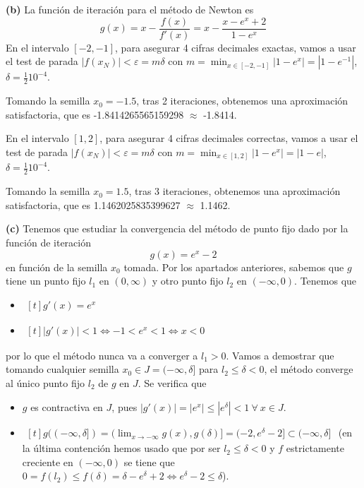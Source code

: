 \documentclass[12pt]{report}
\begin{document}
\vspace{2mm}
\textbf{(b) } La función de iteración para el método de Newton es
\[g(x) = x-\frac{f(x)}{f'(x)} = x - \frac{x-e^x+2}{1-e^x}\]
En el intervalo $[-2,-1]$, para asegurar 4 cifras decimales exactas, vamos a usar el test de parada $|f(x_N)|< \varepsilon = m\delta$ con $\displaystyle m = \min_{x \in [-2,-1]} |1-e^x| = |1-e^{-1}|$, $\delta = \frac{1}{2}10^{-4}$. 

\vspace{2mm}
Tomando la semilla $x_0 = -1.5$, tras 2 iteraciones, obtenemos una aproximación satisfactoria, que es -1.8414265565159298 $\approx$ -1.8414.

\vspace{2mm}
En el intervalo $[1,2]$, para asegurar 4 cifras decimales correctas, vamos a usar el test de parada $|f(x_N)|< \varepsilon = m\delta$ con $\displaystyle m = \min_{x \in [1,2]} |1-e^x| = |1-e|$, $\delta = \frac{1}{2}10^{-4}$.

\vspace{2mm}
Tomando la semilla $x_0 = 1.5$, tras 3 iteraciones, obtenemos una aproximación satisfactoria, que es 1.1462025835399627 $\approx$ 1.1462.

\vspace{2mm}
\textbf{(c) } Tenemos que estudiar la convergencia del método de punto fijo dado por la función de iteración
\[g(x) = e^x-2\]
en función de la semilla $x_0$ tomada. Por los apartados anteriores, sabemos que $g$ tiene un punto fijo $l_1$ en $(0,\infty)$ y otro punto fijo $l_2$ en $(-\infty,0)$. Tenemos que 
\begin{itemize}
    \item
    $
    \begin{aligned}[t]
        g'(x) = e^x
    \end{aligned}
    $
    \item
    $
    \begin{aligned}[t]
        |g'(x)|<1 \iff -1<e^x<1 \iff x < 0
    \end{aligned}
    $
\end{itemize}
por lo que el método nunca va a converger a $l_1 > 0$. Vamos a demostrar que tomando cualquier semilla $x_0 \in J = (-\infty,\delta]$ para $l_2 \leq \delta<0$, el método converge al único punto fijo $l_2$ de $g$ en $J$. Se verifica que
\begin{itemize}
    \item $g$ es contractiva en $J$, pues $|g'(x)| = |e^x| \leq |e^\delta| < 1 \ \forall \ x \in J$.
    \item 
    $
    \begin{aligned}[t]
        g((-\infty,\delta]) = (\lim_{x \to -\infty} g(x), g(\delta)] = (-2,e^\delta-2] \subset (-\infty,\delta]
    \end{aligned}
    $
    (en la última contención hemos usado que por ser $l_2 \leq \delta<0$ y $f$ estrictamente creciente en $(-\infty,0)$ se tiene que $0 = f(l_2) \leq f(\delta) = \delta - e^\delta +2 \iff e^\delta-2 \leq \delta$).
\end{itemize}
\end{document}
